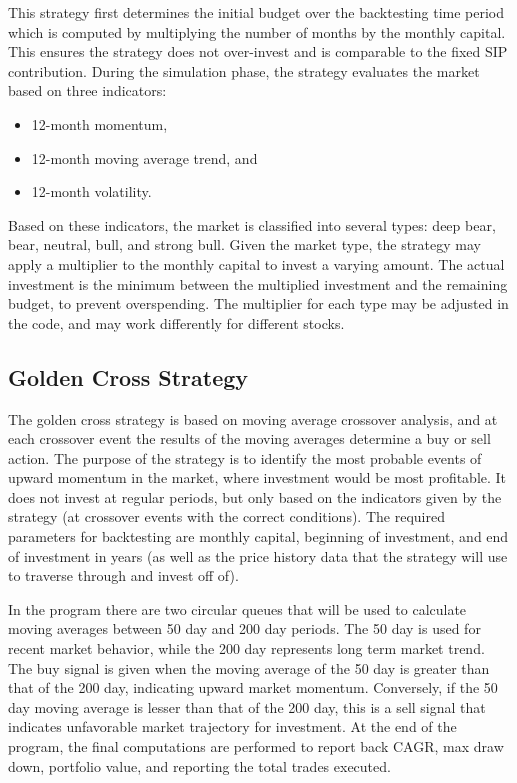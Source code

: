 \documentclass[12pt]{article}
\begin{document}
This strategy first determines the initial budget over the backtesting time period which is computed by multiplying the number of months by the monthly capital. This ensures the strategy does not over-invest and is comparable to the fixed SIP contribution. 
During the simulation phase, the strategy evaluates the market based on three indicators: 
\begin{itemize}
    \item 12-month momentum, 
    \item 12-month moving average trend, and
    \item 12-month volatility. 
\end{itemize}
Based on these indicators, the market is classified into several types: deep bear, bear, neutral, bull, and strong bull. Given the market type, the strategy may apply a multiplier to the monthly capital to invest a varying amount. The actual investment is the minimum between the multiplied investment and the remaining budget, to prevent overspending. The multiplier for each type may be adjusted in the code, and may work differently for different stocks. 


\subsection{Golden Cross Strategy}
The golden cross strategy is based on moving average crossover analysis, and at each crossover event the results of the moving averages determine a buy or sell action. The purpose of the strategy is to identify the most probable events of upward momentum in the market, where investment would be most profitable. It does not invest at regular periods, but only based on the indicators given by the strategy (at crossover events with the correct conditions). The required parameters for backtesting are monthly capital, beginning of investment, and end of investment in years (as well as the price history data that the strategy will use to traverse through and invest off of). 

In the program there are two circular queues that will be used to calculate moving averages between 50 day and 200 day periods. The 50 day is used for recent market behavior, while the 200 day represents long term market trend. The buy signal is given when the moving average of the 50 day is greater than that of the 200 day, indicating upward market momentum. Conversely, if the 50 day moving average is lesser than that of the 200 day, this is a sell signal that indicates unfavorable market trajectory for investment. At the end of the program, the final computations are performed to report back CAGR, max draw down, portfolio value, and reporting the total trades executed. 
\end{document}
